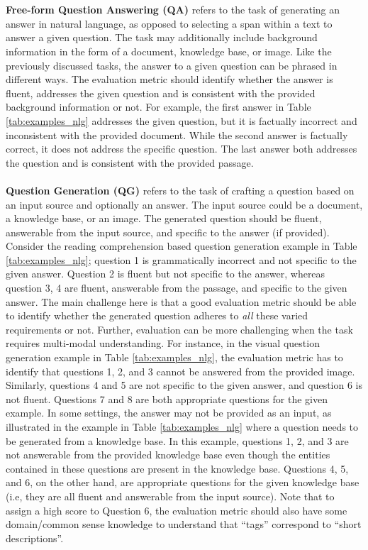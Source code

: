 \\\\
\textbf{Free-form Question Answering (QA)} refers to the task of generating an answer in natural language, as opposed to selecting a span within a text to answer a given question. The task may additionally include background information in the form of a document, knowledge base, or image. Like the previously discussed tasks, the answer to a given question can be phrased in different ways. The evaluation metric should identify whether the answer is fluent, addresses the given question and is consistent with the provided background information or not. For example, the first answer in Table \ref{tab:examples_nlg} addresses the given question, but it is factually incorrect and inconsistent with the provided document. While the second answer is factually correct, it does not address the specific question. The last answer both addresses the question and is consistent with the provided passage.  
\\\\
\textbf{Question Generation (QG)} refers to the task of crafting a question based on an input source and optionally an answer. The input source could be a document, a knowledge base, or an image. The generated question should be fluent, answerable from the input source, and specific to the answer (if provided). Consider the reading comprehension based question generation example in Table \ref{tab:examples_nlg}; question 1 is grammatically incorrect and not specific to the given answer. Question 2 is fluent but not specific to the answer, whereas question 3, 4 are fluent, answerable from the passage, and specific to the given answer. The main challenge here is that a good evaluation metric should be able to identify whether the generated question adheres to \textit{all} these varied requirements or not. Further, evaluation can be more challenging when the task requires multi-modal understanding. For instance, in the visual question generation example in Table \ref{tab:examples_nlg}, the evaluation metric has to identify that questions 1, 2, and 3 cannot be answered from the provided image. Similarly, questions 4 and 5 are not specific to the given answer, and question 6 is not fluent. Questions 7 and 8 are both appropriate questions for the given example. In some settings, the answer may not be provided as an input, as illustrated in the example in Table \ref{tab:examples_nlg} where a question needs to be generated from a knowledge base. In this example, questions 1, 2, and 3 are not answerable from the provided knowledge base even though the entities contained in these questions are present in the knowledge base. Questions 4, 5, and 6, on the other hand, are appropriate questions for the given knowledge base (i.e, they are all fluent and answerable from the input source). Note that to assign a high score to Question 6, the evaluation metric should also have some domain/common sense knowledge to understand that ``tags'' correspond to ``short descriptions''.
